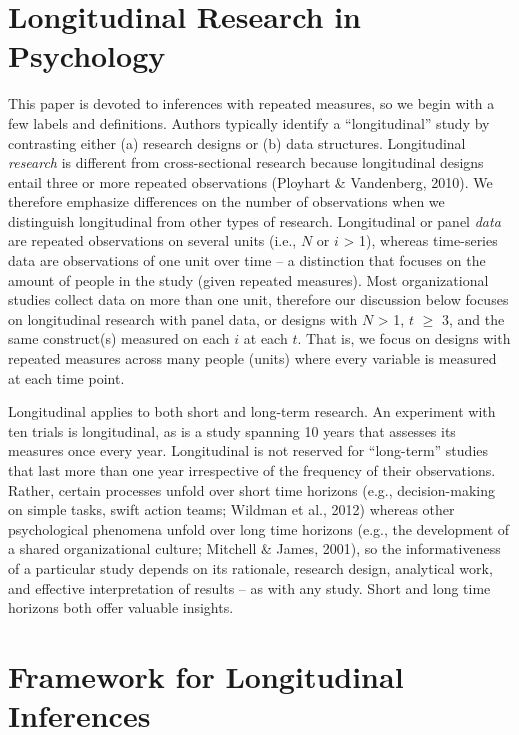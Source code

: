 \documentclass[english,,man]{apa6}
\theoremstyle{definition}
\theoremstyle{definition}
\theoremstyle{definition}
\theoremstyle{remark}
\begin{document}
\hypertarget{longitudinal-research-in-psychology}{%
\section{Longitudinal Research in
Psychology}\label{longitudinal-research-in-psychology}}

This paper is devoted to inferences with repeated measures, so we begin
with a few labels and definitions. Authors typically identify a
\enquote{longitudinal} study by contrasting either (a) research designs
or (b) data structures. Longitudinal \emph{research} is different from
cross-sectional research because longitudinal designs entail three or
more repeated observations (Ployhart \& Vandenberg, 2010). We therefore
emphasize differences on the number of observations when we distinguish
longitudinal from other types of research. Longitudinal or panel
\emph{data} are repeated observations on several units (i.e., \(N\) or
\(i\) \textgreater{} 1), whereas time-series data are observations of
one unit over time -- a distinction that focuses on the amount of people
in the study (given repeated measures). Most organizational studies
collect data on more than one unit, therefore our discussion below
focuses on longitudinal research with panel data, or designs with \(N\)
\textgreater{} 1, \(t\) \(\geq\) 3, and the same construct(s) measured
on each \(i\) at each \(t\). That is, we focus on designs with repeated
measures across many people (units) where every variable is measured at
each time point.

Longitudinal applies to both short and long-term research. An experiment
with ten trials is longitudinal, as is a study spanning 10 years that
assesses its measures once every year. Longitudinal is not reserved for
\enquote{long-term} studies that last more than one year irrespective of
the frequency of their observations. Rather, certain processes unfold
over short time horizons (e.g., decision-making on simple tasks, swift
action teams; Wildman et al., 2012) whereas other psychological
phenomena unfold over long time horizons (e.g., the development of a
shared organizational culture; Mitchell \& James, 2001), so the
informativeness of a particular study depends on its rationale, research
design, analytical work, and effective interpretation of results -- as
with any study. Short and long time horizons both offer valuable
insights.

\hypertarget{framework-for-longitudinal-inferences}{%
\section{Framework for Longitudinal
Inferences}\label{framework-for-longitudinal-inferences}}
\end{document}
